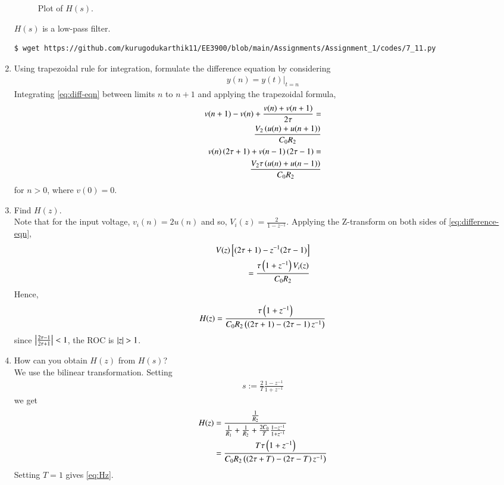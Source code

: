 \documentclass[journal,12pt,twocolumn]{IEEEtran}
\renewcommand\thesection{\arabic{section}}
\begin{document}
\begin{enumerate}[label=\arabic*.,ref=\thesection.\theenumi]
\begin{figure}[!ht]
\caption{Plot of $H(s)$.}
\label{fig:Hs}
\end{figure}
$H(s)$ is a low-pass filter.
\begin{lstlisting}
$ wget https://github.com/kurugodukarthik11/EE3900/blob/main/Assignments/Assignment_1/codes/7_11.py
\end{lstlisting}
\item Using trapezoidal rule for integration, formulate the difference equation
by considering
\begin{align}
y(n) = y(t)\vert_{t=n}
\end{align}
\solution
Integrating \eqref{eq:diff-eqn} between limits $n$ to $n+1$
and applying the trapezoidal formula,
\begin{align}
v(n+1) - v(n) + \frac{v(n) + v(n+1)}{2\tau} = \nonumber\\
\frac{V_2\left(u(n)+u(n+1)\right)}{C_0R_2} \\
v(n)\left(2\tau+1\right) + v(n-1)\left(2\tau-1\right) = \nonumber\\
\frac{V_2\tau\left(u(n)+u(n-1)\right)}{C_0R_2}
\label{eq:difference-eqn}
\end{align}
for $n > 0$, where $v(0) = 0$.
\item Find $H(z)$. \\
\solution Note that for the input voltage, $v_i(n) = 2u(n)$ and
so, $V_i(z) = \frac{2}{1-z^{-1}}$. Applying the Z-transform
on both sides of \eqref{eq:difference-eqn},
\begin{align}
V(z){}\left[(2\tau + 1) - z^{-1}(2\tau - 1)\right] \nonumber \\
= \frac{\tau\left(1 + z^{-1}\right)V_i(z)}{C_0R_2}
\end{align}
Hence,
\begin{align}
H(z) = \frac{\tau\left(1+z^{-1}\right)}{C_0R_2\left(\left(2\tau+1\right)-\left(2\tau-1\right)z^{-1}\right)}
\label{eq:Hz}
\end{align}
since $\left\vert\frac{2\tau-1}{2\tau+1}\right\vert < 1$, the ROC is $\left\vert z\right\vert > 1$.
\\
\item How can you obtain $H(z)$ from $H(s)$? \\
\solution We use the bilinear transformation. Setting
\begin{align}
s := \frac{2}{T}\frac{1 - z^{-1}}{1 + z^{-1}}
\end{align}
we get
\begin{align}
H(z) &= \frac{\frac{1}{R_2}}{\frac{1}{R_1} + \frac{1}{R_2} + \frac{2C_0}{T}\frac{1 - z^{-1}}{1 + z^{-1}}} \\
&= \frac{T\tau\left(1+z^{-1}\right)}{C_0R_2\left(\left(2\tau+T\right)-\left(2\tau-T\right)z^{-1}\right)}
\end{align}
Setting $T = 1$ gives \eqref{eq:Hz}.
\end{enumerate}
\end{document}
